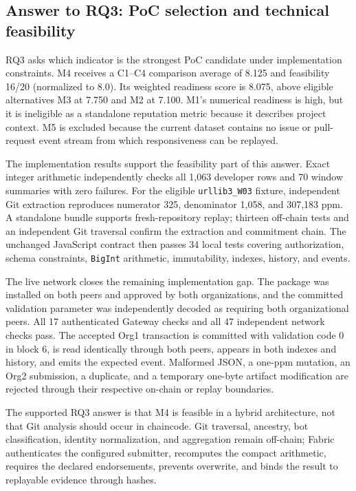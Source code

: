\subsection{Answer to RQ3: PoC selection and technical feasibility}
\label{sec:final_rq3}

RQ3 asks which indicator is the strongest PoC candidate under implementation constraints. M4 receives a C1--C4 comparison
average of 8.125 and feasibility 16/20 (normalized to 8.0). Its weighted readiness score is 8.075, above eligible alternatives
M3 at 7.750 and M2 at 7.100. M1's numerical readiness is high, but it is ineligible as a standalone reputation metric because
it describes project context. M5 is excluded because the current dataset contains no issue or pull-request event stream from
which responsiveness can be replayed.

The implementation results support the feasibility part of this answer. Exact integer arithmetic independently checks all
1,063 developer rows and 70 window summaries with zero failures. For the eligible \texttt{urllib3\_W03} fixture, independent
Git extraction reproduces numerator 325, denominator 1,058, and 307,183 ppm. A standalone bundle supports fresh-repository
replay; thirteen off-chain tests and an independent Git traversal confirm the extraction and commitment chain. The unchanged
JavaScript contract then passes 34 local tests covering authorization, schema constraints, \texttt{BigInt} arithmetic,
immutability, indexes, history, and events.

The live network closes the remaining implementation gap. The package was installed on both peers and approved by both
organizations, and the
committed validation parameter was independently decoded as requiring both organizational peers. All 17 authenticated Gateway
checks and all 47 independent network checks pass. The accepted Org1 transaction is committed with validation code 0 in block
6, is read identically through both peers, appears in both indexes and history, and emits the expected event. Malformed JSON,
a one-ppm mutation, an Org2 submission, a duplicate, and a temporary one-byte artifact modification are rejected through their
respective on-chain or replay boundaries.

The supported RQ3 answer is that M4 is feasible in a hybrid architecture, not that Git analysis should occur in chaincode.
Git traversal, ancestry, bot classification, identity normalization, and aggregation remain off-chain; Fabric authenticates
the configured submitter, recomputes the compact arithmetic, requires the declared endorsements, prevents overwrite, and binds
the result to replayable evidence through hashes.

